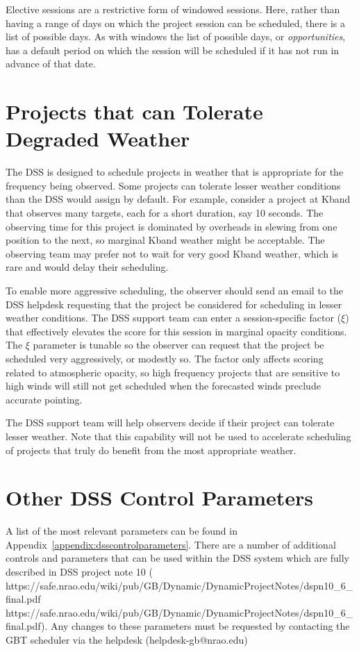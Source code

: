 Elective sessions are a restrictive form of windowed sessions.  Here, rather than having a
range of days on which the project session can be scheduled, there is a list of possible days.
As with windows the list of possible days, or {\it opportunities}, has a default period on
which the session will be scheduled if it has not run in advance of that date.

\vspace{-5mm}

\section{Projects that can Tolerate Degraded Weather}

\vspace{-5mm}

The \gls{DSS} is designed to schedule projects in weather that is appropriate for the
frequency being observed. Some projects can tolerate lesser weather conditions than the
\gls{DSS} would assign by default. For example, consider a project at \gls{Kband} that
observes many targets, each for a short duration, say 10 seconds. The observing time for
this project is dominated by overheads in slewing from one position to the next, so
marginal \gls{Kband} weather might be acceptable. The observing team may prefer not to
wait for very good \gls{Kband} weather, which is rare and would delay their scheduling.

To enable more aggressive scheduling, the observer should send an email to the \gls{DSS}
helpdesk requesting that the project be considered for scheduling in lesser weather
conditions. The \gls{DSS} support team can enter a session-specific factor ($\xi$) that
effectively elevates the score for this session in marginal opacity conditions. The $\xi$
parameter is tunable so the observer can request that the project be scheduled very
aggressively, or modestly so. The factor only affects scoring related to atmospheric
opacity, so high frequency projects that are sensitive to high winds will still not get
scheduled when the forecasted winds preclude accurate pointing.

The \gls{DSS} support team will help observers decide if their project can tolerate lesser
weather. Note that this capability will not be used to accelerate scheduling of projects
that truly do benefit from the most appropriate weather.

\section{Other DSS Control Parameters}

A list of the most relevant parameters can be found in
Appendix~\ref{appendix:dsscontrolparameters}. There are a number of additional controls
and parameters that can be used within the DSS system which are fully described in
\gls{DSS} project note 10 (\htmladdnormallink
{https://safe.nrao.edu/wiki/pub/GB/Dynamic/DynamicProjectNotes/dspn10\_6\_final.pdf}
{https://safe.nrao.edu/wiki/pub/GB/Dynamic/DynamicProjectNotes/dspn10\_6\_final.pdf}).
Any changes to these parameters must be requested by contacting the GBT scheduler via
the helpdesk (helpdesk-gb@nrao.edu)

